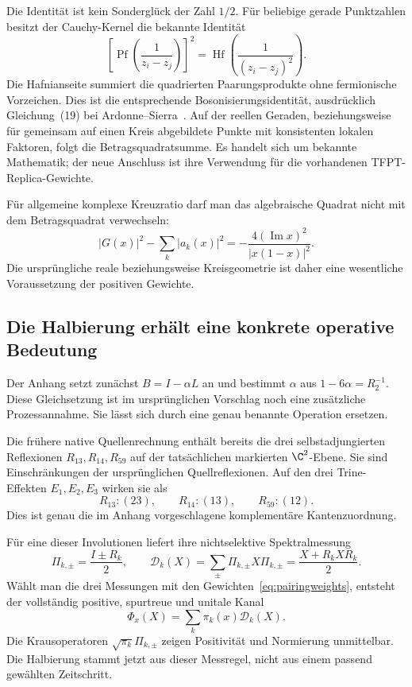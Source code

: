Die Identität ist kein Sonderglück der Zahl $1/2$. Für beliebige gerade Punktzahlen besitzt der Cauchy-Kernel die bekannte Identität
\begin{equation}
\left[\operatorname{Pf}\left(\frac1{z_i-z_j}\right)\right]^2
=
\operatorname{Hf}\left(\frac1{(z_i-z_j)^2}\right).
\end{equation}
Die Hafnianseite summiert die quadrierten Paarungsprodukte ohne fermionische Vorzeichen. Dies ist die entsprechende Bosonisierungsidentität, ausdrücklich Gleichung~(19) bei Ardonne--Sierra~\cite{ardonneising}. Auf der reellen Geraden, beziehungsweise für gemeinsam auf einen Kreis abgebildete Punkte mit konsistenten lokalen Faktoren, folgt die Betragsquadratsumme. Es handelt sich um bekannte Mathematik; der neue Anschluss ist ihre Verwendung für die vorhandenen TFPT-Replica-Gewichte.

Für allgemeine komplexe Kreuzratio darf man das algebraische Quadrat nicht mit dem Betragsquadrat verwechseln:
\begin{equation}
|G(x)|^2-\sum_k|a_k(x)|^2
=-\frac{4(\operatorname{Im}x)^2}{|x(1-x)|^2}.
\end{equation}
Die ursprüngliche reale beziehungsweise Kreisgeometrie ist daher eine wesentliche Voraussetzung der positiven Gewichte.

\subsection{Die Halbierung erhält eine konkrete operative Bedeutung}
Der Anhang setzt zunächst $B=I-\alpha L$ an und bestimmt $\alpha$ aus
$1-6\alpha=R_2^{-1}$. Diese Gleichsetzung ist im ursprünglichen Vorschlag noch eine zusätzliche Prozessannahme. Sie lässt sich durch eine genau benannte Operation ersetzen.

Die frühere native Quellenrechnung enthält bereits die drei selbstadjungierten Reflexionen $R_{13},R_{14},R_{59}$ auf der tatsächlichen markierten $\C^2$-Ebene. Sie sind Einschränkungen der ursprünglichen Quellreflexionen. Auf den drei Trine-Effekten $E_1,E_2,E_3$ wirken sie als
\begin{equation}
R_{13}:(23),\qquad R_{14}:(13),\qquad R_{59}:(12).
\end{equation}
Dies ist genau die im Anhang vorgeschlagene komplementäre Kantenzuordnung.

Für eine dieser Involutionen liefert ihre nichtselektive Spektralmessung
\begin{equation}
\Pi_{k,\pm}=\frac{I\pm R_k}{2},\qquad
\mathcal D_k(X)=\sum_{\pm}\Pi_{k,\pm}X\Pi_{k,\pm}
=\frac{X+R_kXR_k}{2}.
\end{equation}
Wählt man die drei Messungen mit den Gewichten~\eqref{eq:pairingweights}, entsteht der vollständig positive, spurtreue und unitale Kanal
\begin{equation}\label{eq:replicaluders}
\boxed{\Phi_x(X)=\sum_k\pi_k(x)\mathcal D_k(X).}
\end{equation}
Die Krausoperatoren $\sqrt{\pi_k}\Pi_{k,\pm}$ zeigen Positivität und Normierung unmittelbar. Die Halbierung stammt jetzt aus dieser Messregel, nicht aus einem passend gewählten Zeitschritt.

